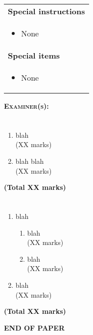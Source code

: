 \documentclass[12pt, a4paper, twosize]{article}
\begin{document}
\begin{titlepage}
\begin{table}[H]
\begin{tabular}{p{14cm}}
{\bf{Special instructions}}\\

    \begin{itemize}
      \item None
    \end{itemize} \\


{\bf{Special items}}\\ 

    \begin{itemize}
      \item None
    \end{itemize} \\


\end{tabular}
\end{table}

\textsc{\Large {\bf{Examiner(s):}} }

\end{titlepage}


\section{}
\begin{enumerate}
\item blah\\
\hspace*{\fill} (XX marks)
\item blah blah\\
\hspace*{\fill} (XX marks)
\end{enumerate}
\hspace*{\fill} {\bf{(Total XX marks)}}


\section{}
\begin{enumerate}
\item blah\\

    \begin{enumerate}[label=\roman*.]

    \item blah\\
    \hspace*{\fill} (XX marks)

    \item blah\\
    \hspace*{\fill} (XX marks)

    \end{enumerate}

\item blah\\
    \hspace*{\fill} (XX marks)
\end{enumerate}
\hspace*{\fill} {\bf{(Total XX marks)}}



\vspace*{2.5cm}
\centerline{{\bf{END OF PAPER}}}
\end{document}
